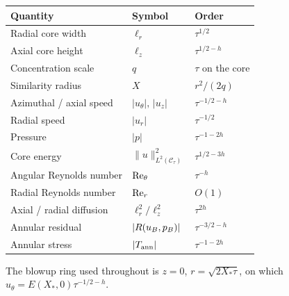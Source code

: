 \begin{center}
\begin{tabular}{@{}lll@{}}
\toprule
Quantity & Symbol & Order \\
\midrule
Radial core width & $\ell_r$ & $\tau^{1/2}$ \\
Axial core height & $\ell_z$ & $\tau^{1/2-h}$ \\
Concentration scale & $q$ & $\tau$ on the core \\
Similarity radius & $X$ & $r^2/(2q)$ \\
Azimuthal / axial speed & $|u_\theta|,\,|u_z|$ & $\tau^{-1/2-h}$ \\
Radial speed & $|u_r|$ & $\tau^{-1/2}$ \\
Pressure & $|p|$ & $\tau^{-1-2h}$ \\
Core energy & $\|u\|_{L^2(\mathcal C_\tau)}^2$ & $\tau^{1/2-3h}$ \\
Angular {R}eynolds number & $\mathrm{Re}_\theta$ & $\tau^{-h}$ \\
Radial {R}eynolds number & $\mathrm{Re}_r$ & $O(1)$ \\
Axial / radial diffusion & $\ell_r^2/\ell_z^2$ & $\tau^{2h}$ \\
Annular residual & $|R(u_B,p_B)|$ & $\tau^{-3/2-h}$ \\
Annular stress & $|T_{\mathrm{ann}}|$ & $\tau^{-1-2h}$ \\
\bottomrule
\end{tabular}
\end{center}

\noindent
The blowup ring used throughout is $z=0$, $r=\sqrt{2X_*\tau}$, on which $u_\theta=E(X_*,0)\tau^{-1/2-h}$.






